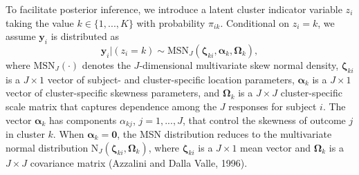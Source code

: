 \documentclass[useAMS,referee]{biom}
\begin{document}
To facilitate posterior inference, we introduce a latent cluster indicator variable $z_i$ taking the value $k \in \{1,...,K\}$ with probability $\pi_{ik}$. Conditional on $z_i = k$, we assume $\mathbf{y}_{i}$ is distributed as
\begin{equation}
\mathbf{y}_{i}|(z_i=k) \sim \text{MSN}_J(\boldsymbol\zeta_{ki},\boldsymbol\alpha_k,\boldsymbol\Omega_k), \label{eq:msndens}
\end{equation}
where $\text{MSN}_J(\cdot)$ denotes the $J$-dimensional multivariate skew normal density, $\boldsymbol\zeta_{ki}$ is a $J \times 1$ vector of subject- and cluster-specific location parameters, $\boldsymbol\alpha_k$ is a $J \times 1$ vector of cluster-specific skewness parameters, and $\boldsymbol\Omega_k$ is a $J \times J$ cluster-specific scale matrix that captures dependence among the $J$ responses for subject $i$. The vector $\boldsymbol\alpha_k$ has components $\alpha_{kj}$, $j = 1,...,J$, that control the skewness of outcome $j$ in cluster $k$. When $\boldsymbol\alpha_k = \mathbf{0}$, the MSN distribution reduces to the multivariate normal distribution $\text{N}_J(\boldsymbol\zeta_{ki},\boldsymbol\Omega_k)$, where $\boldsymbol\zeta_{ki}$ is a $J \times 1$ mean vector and $\boldsymbol\Omega_k$ is a $J \times J$ covariance matrix (Azzalini and Dalla Valle, 1996).
\end{document}

